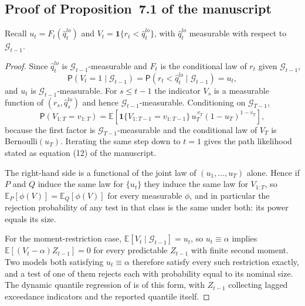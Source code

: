 \documentclass[preprint,11pt,authoryear]{elsarticle}
\newcommand{\E}{\mathbb{E}}
\renewcommand{\P}{\mathsf{P}}
\newcommand{\1}{\boldsymbol{1}}
\begin{document}

\subsection{Proof of Proposition~7.1 of the manuscript}
\label{app:identification}

Recall $u_t = F_t(\hat q^{lo}_t)$ and $V_t = \mathbf 1\{r_t < \hat q^{lo}_t\}$,
with $\hat q^{lo}_t$ measurable with respect to $\mathcal G_{t-1}$.

\begin{proof}
	Since $\hat q^{lo}_t$ is $\mathcal G_{t-1}$-measurable and $F_t$ is the
	conditional law of $r_t$ given $\mathcal G_{t-1}$,
	\[
	\P\!\left(V_t = 1 \mid \mathcal G_{t-1}\right)
	= \P\!\left(r_t < \hat q^{lo}_t \mid \mathcal G_{t-1}\right) = u_t ,
	\]
	and $u_t$ is $\mathcal G_{t-1}$-measurable. For $s \le t-1$ the indicator
	$V_s$ is a measurable function of $(r_s, \hat q^{lo}_s)$ and hence
	$\mathcal G_{t-1}$-measurable. Conditioning on $\mathcal G_{T-1}$,
	\[
	\P\!\left(V_{1:T}=v_{1:T}\right)
	= \E\!\left[\mathbf 1\{V_{1:T-1}=v_{1:T-1}\}\,
	u_T^{\,v_T}(1-u_T)^{1-v_T}\right],
	\]
	because the first factor is $\mathcal G_{T-1}$-measurable and the conditional
	law of $V_T$ is Bernoulli$(u_T)$. Iterating the same step down to $t=1$ gives
	the path likelihood stated as equation (12) of the manuscript.

	The right-hand side is a functional of the joint law of $(u_1,\dots,u_T)$
	alone. Hence if $P$ and $Q$ induce the same law for $\{u_t\}$ they induce the
	same law for $V_{1:T}$, so $\E_P[\phi(V)] = \E_Q[\phi(V)]$ for every
	measurable $\phi$, and in particular the rejection probability of any test in
	that class is the same under both: its power equals its size.

	For the moment-restriction case, $\E[V_t \mid \mathcal G_{t-1}] = u_t$, so
	$u_t \equiv \alpha$ implies $\E[(V_t-\alpha)Z_{t-1}] = 0$ for every
	predictable $Z_{t-1}$ with finite second moment. Two models both satisfying
	$u_t\equiv\alpha$ therefore satisfy every such restriction exactly, and a test
	of one of them rejects each with probability equal to its nominal size. The
	dynamic quantile regression of \citet{engle2004caviar} is of this form, with
	$Z_{t-1}$ collecting lagged exceedance indicators and the reported quantile
	itself.
\end{proof}
\end{document}
